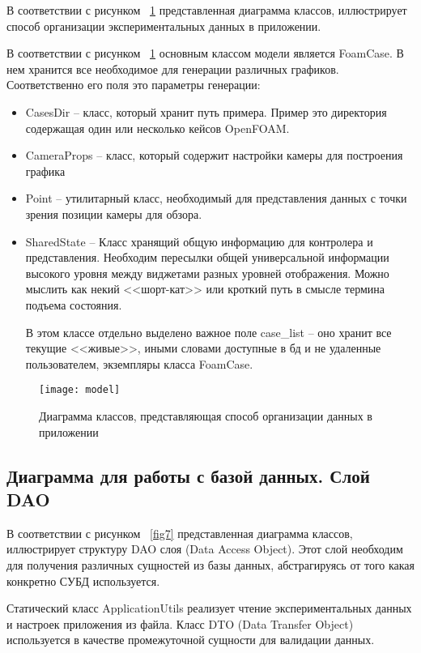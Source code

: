 \documentclass[14pt]{extreport}
\begin{document}
В соответствии с рисунком ~\ref{fig6} представленная диаграмма классов, иллюстрирует способ организации экспериментальных данных в приложении. 

В соответствии с рисунком ~\ref{fig6} основным классом модели является FoamCase. В нем хранится все необходимое для генерации различных графиков. Соответственно его поля это параметры генерации:
\begin{itemize}
	\item CasesDir -- класс, который хранит путь примера. Пример это директория содержащая один или несколько кейсов OpenFOAM.
	\item CameraProps -- класс, который содержит настройки камеры для построения графика
	\item Point -- утилитарный класс, необходимый для представления данных с точки зрения позиции камеры для обзора.
	\item SharedState -- Класс хранящий общую информацию для контролера и представления. Необходим пересылки общей универсальной информации высокого уровня между виджетами разных уровней отображения. Можно мыслить как некий <<шорт-кат>> или кроткий путь в смысле термина подъема состояния. 
	
	В этом классе отдельно выделено важное поле case\_list -- оно хранит все текущие <<живые>>, иными словами доступные в бд и не удаленные пользователем, экземпляры класса FoamCase.
\end{itemize}

\begin{figure}[H]
\centerline{\texttt{[image: model]}}
\caption{Диаграмма классов, представляющая способ организации данных в приложении}
\label{fig6}
\end{figure}


\subsection{Диаграмма для работы с базой данных. Слой DAO}
В соответствии с рисунком ~\ref{fig7} представленная диаграмма классов, иллюстрирует структуру DAO слоя (Data Access Object). Этот слой необходим для получения различных сущностей из базы данных, абстрагируясь от того какая конкретно СУБД используется. 

Статический класс ApplicationUtils реализует чтение экспериментальных данных и настроек приложения из файла. Класс DTO (Data Transfer Object) используется в качестве промежуточной сущности для валидации данных.
\end{document}
